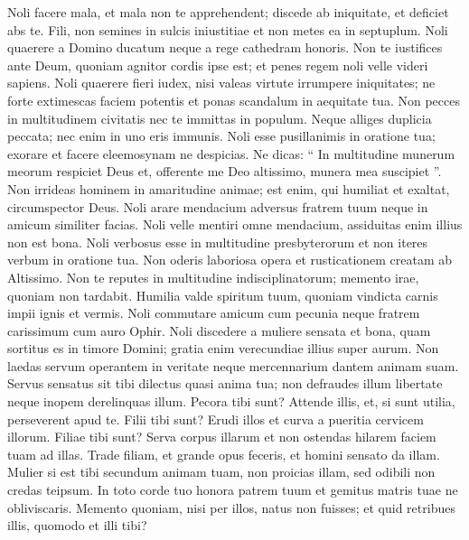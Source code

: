 \begin{biblechapter}
\begin{biblechapter}
\begin{biblechapter}
\begin{biblechapter}
\begin{biblechapter}
\begin{biblechapter}
\begin{biblechapter}
\verse Noli facere mala, et mala non te apprehendent;
 \verse discede ab iniquitate, et deficiet abs te.
 \verse Fili, non semines in sulcis iniustitiae
 et non metes ea in septuplum.
 \verse Noli quaerere a Domino ducatum
 neque a rege cathedram honoris.
 \verse Non te iustifices ante Deum,
 quoniam agnitor cordis ipse est;
 et penes regem noli velle videri sapiens.
 \verse Noli quaerere fieri iudex,
 nisi valeas virtute irrumpere iniquitates;
 ne forte extimescas faciem potentis
 et ponas scandalum in aequitate tua.
 \verse Non pecces in multitudinem civitatis
 nec te immittas in populum.
 \verse Neque alliges duplicia peccata;
 nec enim in uno eris immunis.
 \verse Noli esse pusillanimis in oratione tua;
 \verse exorare et facere eleemosynam ne despicias.
 \verse Ne dicas: “ In multitudine munerum meorum respiciet Deus
 et, offerente me Deo altissimo, munera mea suscipiet ”.
 \verse Non irrideas hominem in amaritudine animae;
 est enim, qui humiliat et exaltat, circumspector Deus.
 \verse Noli arare mendacium adversus fratrem tuum
 neque in amicum similiter facias.
 \verse Noli velle mentiri omne mendacium,
 assiduitas enim illius non est bona.
 \verse Noli verbosus esse in multitudine presbyterorum
 et non iteres verbum in oratione tua.
 \verse Non oderis laboriosa opera
 et rusticationem creatam ab Altissimo.
 \verse Non te reputes in multitudine indisciplinatorum;
 \verse memento irae, quoniam non tardabit.
 \verse Humilia valde spiritum tuum,
 quoniam vindicta carnis impii ignis et vermis.
 \verse Noli commutare amicum cum pecunia
 neque fratrem carissimum cum auro Ophir.
 \verse Noli discedere a muliere sensata et bona,
 quam sortitus es in timore Domini;
 gratia enim verecundiae illius super aurum.
 \verse Non laedas servum operantem in veritate
 neque mercennarium dantem animam suam.
 \verse Servus sensatus sit tibi dilectus quasi anima tua;
 non defraudes illum libertate
 neque inopem derelinquas illum.
 \verse Pecora tibi sunt? Attende illis,
 et, si sunt utilia, perseverent apud te.
 \verse Filii tibi sunt? Erudi illos
 et curva a pueritia cervicem illorum.
 \verse Filiae tibi sunt? Serva corpus illarum
 et non ostendas hilarem faciem tuam ad illas.
 \verse Trade filiam, et grande opus feceris,
 et homini sensato da illam.
 \verse Mulier si est tibi secundum animam tuam, non proicias illam,
 sed odibili non credas teipsum.
 In toto corde tuo 
\verse honora patrem tuum
 et gemitus matris tuae ne obliviscaris.
 \verse Memento quoniam, nisi per illos, natus non fuisses;
 et quid retribues illis, quomodo et illi tibi?

\end{biblechapter}
\end{biblechapter}
\end{biblechapter}
\end{biblechapter}
\end{biblechapter}
\end{biblechapter}
\end{biblechapter}
